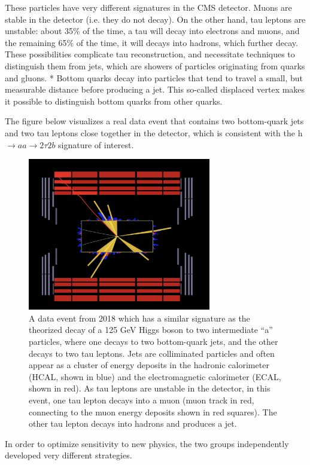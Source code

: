 \documentclass{article}
\begin{document}
These particles have very different signatures in the CMS detector. Muons are stable in the detector (i.e. they do not decay). On the other hand, tau leptons are unstable: about 35\% of the time, a tau will decay into electrons and muons, and the remaining 65\% of the time, it will decays into hadrons, 
which further decay. These possibilities complicate tau reconstruction, and necessitate techniques to distinguish them from jets, which are showers of particles originating from quarks and gluons.
* Bottom quarks decay into particles that tend to travel a small, but measurable distance before producing a jet. This so-called displaced vertex makes it possible to distinguish bottom quarks from other quarks.

The figure below visualizes a real data event that contains two bottom-quark jets and two tau leptons close together in the detector, which is consistent with the h $\rightarrow aa \rightarrow 2\tau 2b$ signature of interest.

\begin{figure}[ht]
    \centering
    \includegraphics[width=8cm]{fireworks_event1/event1_barrel_slice.png}
    \caption{A data event from 2018 which has a similar signature as the theorized decay of a 125 GeV Higgs boson to two intermediate ``a'' particles, where one decays to two bottom-quark jets,
    and the other decays to two tau leptons. Jets are colliminated particles and often appear as a cluster of energy deposits in the hadronic calorimeter (HCAL, shown in blue) and the electromagnetic calorimeter (ECAL, shown in red). 
    As tau leptons are unstable in the detector, in this event, one tau lepton decays into a muon (muon track in red, connecting to the muon energy deposits shown in red squares).
    The other tau lepton decays into hadrons and produces a jet.}
\end{figure}


In order to optimize sensitivity to new physics, the two groups independently developed very different strategies.
\end{document}
